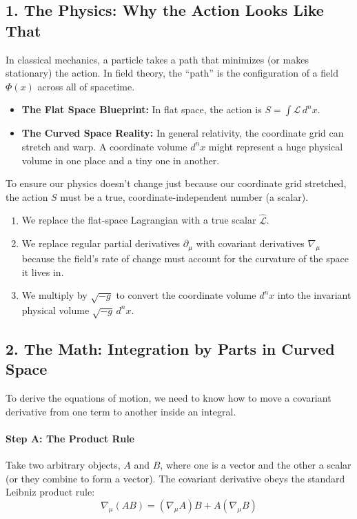 \documentclass[11pt, a4paper]{report}
\begin{document}
\subsection*{1. The Physics: Why the Action Looks Like That}

In classical mechanics, a particle takes a path that minimizes (or makes stationary) the action. In field theory, the ``path'' is the configuration of a field $\Phi(x)$ across all of spacetime. 

\begin{itemize}
    \item \textbf{The Flat Space Blueprint:} In flat space, the action is $S = \int \mathcal{L} \, d^n x$. 
    \item \textbf{The Curved Space Reality:} In general relativity, the coordinate grid can stretch and warp. A coordinate volume $d^n x$ might represent a huge physical volume in one place and a tiny one in another. 
\end{itemize}

To ensure our physics doesn't change just because our coordinate grid stretched, the action $S$ must be a true, coordinate-independent number (a scalar). 
\begin{enumerate}
    \item We replace the flat-space Lagrangian with a true scalar $\hat{\mathcal{L}}$.
    \item We replace regular partial derivatives $\partial_\mu$ with covariant derivatives $\nabla_\mu$ because the field's rate of change must account for the curvature of the space it lives in.
    \item We multiply by $\sqrt{-g}$ to convert the coordinate volume $d^n x$ into the invariant physical volume $\sqrt{-g} \, d^n x$.
\end{enumerate}

\subsection*{2. The Math: Integration by Parts in Curved Space}

To derive the equations of motion, we need to know how to move a covariant derivative from one term to another inside an integral. 

\paragraph{Step A: The Product Rule}
Take two arbitrary objects, $A$ and $B$, where one is a vector and the other a scalar (or they combine to form a vector). The covariant derivative obeys the standard Leibniz product rule:
\begin{equation}
    \nabla_\mu (A B) = (\nabla_\mu A) B + A (\nabla_\mu B)
\end{equation}
\end{document}
